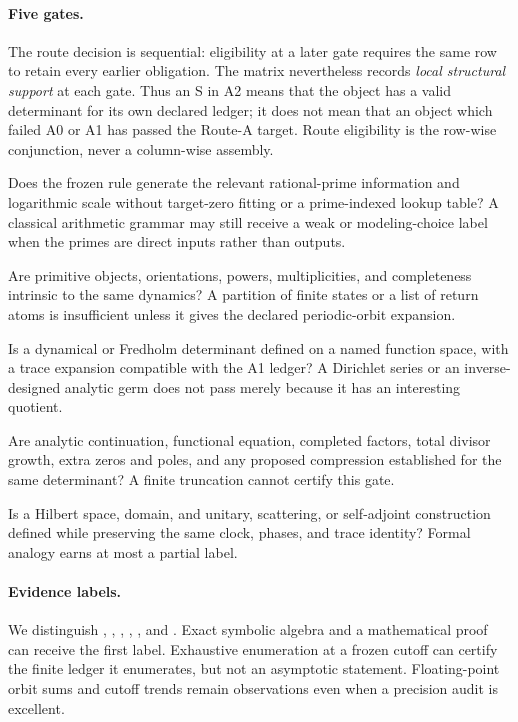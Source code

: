 \paragraph{Five gates.}
The route decision is sequential: eligibility at a later gate requires the
same row to retain every earlier obligation.  The matrix nevertheless records
\emph{local structural support} at each gate.  Thus an S in A2 means that the
object has a valid determinant for its own declared ledger; it does not mean
that an object which failed A0 or A1 has passed the Route-A target.  Route
eligibility is the row-wise conjunction, never a column-wise assembly.
\begin{description}[leftmargin=3.1em,style=nextline]
  \item[A0: arithmetic origin.]
  Does the frozen rule generate the relevant rational-prime information and
  logarithmic scale without target-zero fitting or a prime-indexed lookup
  table?  A classical arithmetic grammar may still receive a weak or
  modeling-choice label when the primes are direct inputs rather than
  outputs.

  \item[A1: primitive/repetition ledger.]
  Are primitive objects, orientations, powers, multiplicities, and
  completeness intrinsic to the same dynamics?  A partition of finite states
  or a list of return atoms is insufficient unless it gives the declared
  periodic-orbit expansion.

  \item[A2: determinant.]
  Is a dynamical or Fredholm determinant defined on a named function space,
  with a trace expansion compatible with the A1 ledger?  A Dirichlet series
  or an inverse-designed analytic germ does not pass merely because it has an
  interesting quotient.

  \item[A3: global structure.]
  Are analytic continuation, functional equation, completed factors, total
  divisor growth, extra zeros and poles, and any proposed compression
  established for the same determinant?  A finite truncation cannot certify
  this gate.

  \item[A4: same-clock lift.]
  Is a Hilbert space, domain, and unitary, scattering, or self-adjoint
  construction defined while preserving the same clock, phases, and trace
  identity?  Formal analogy earns at most a partial label.
\end{description}

\paragraph{Evidence labels.}
We distinguish , ,
, ,
, and .  Exact symbolic algebra and a
mathematical proof can receive the first label.  Exhaustive enumeration at a
frozen cutoff can certify the finite ledger it enumerates, but not an
asymptotic statement.  Floating-point orbit sums and cutoff trends remain
observations even when a precision audit is excellent.

